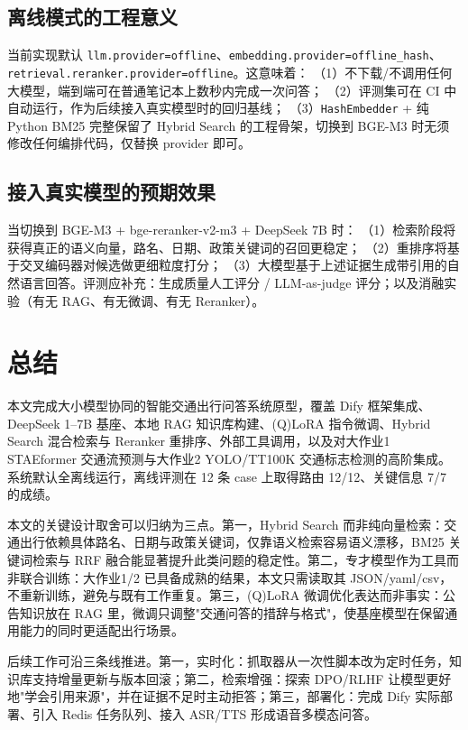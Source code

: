 \documentclass[bwprint]{report}
\begin{document}
\subsection{离线模式的工程意义}
当前实现默认 \texttt{llm.provider=offline}、\texttt{embedding.provider=offline\_hash}、\texttt{retrieval.reranker.provider=offline}。这意味着：
（1）不下载/不调用任何大模型，端到端可在普通笔记本上数秒内完成一次问答；
（2）评测集可在 CI 中自动运行，作为后续接入真实模型时的回归基线；
（3）\texttt{HashEmbedder} + 纯 Python BM25 完整保留了 Hybrid Search 的工程骨架，切换到 BGE-M3 时无须修改任何编排代码，仅替换 provider 即可。

\subsection{接入真实模型的预期效果}
当切换到 BGE-M3 + bge-reranker-v2-m3 + DeepSeek 7B 时：
（1）检索阶段将获得真正的语义向量，路名、日期、政策关键词的召回更稳定；
（2）重排序将基于交叉编码器对候选做更细粒度打分；
（3）大模型基于上述证据生成带引用的自然语言回答。评测应补充：生成质量人工评分 / LLM-as-judge 评分；以及消融实验（有无 RAG、有无微调、有无 Reranker）。

\section{总结}
本文完成大小模型协同的智能交通出行问答系统原型，覆盖 Dify 框架集成、DeepSeek 1--7B 基座、本地 RAG 知识库构建、(Q)LoRA 指令微调、Hybrid Search 混合检索与 Reranker 重排序、外部工具调用，以及对大作业1 STAEformer 交通流预测与大作业2 YOLO/TT100K 交通标志检测的高阶集成。系统默认全离线运行，离线评测在 12 条 case 上取得路由 12/12、关键信息 7/7 的成绩。

本文的关键设计取舍可以归纳为三点。第一，Hybrid Search 而非纯向量检索：交通出行依赖具体路名、日期与政策关键词，仅靠语义检索容易语义漂移，BM25 关键词检索与 RRF 融合能显著提升此类问题的稳定性。第二，专才模型作为工具而非联合训练：大作业1/2 已具备成熟的结果，本文只需读取其 JSON/yaml/csv，不重新训练，避免与既有工作重复。第三，(Q)LoRA 微调优化表达而非事实：公告知识放在 RAG 里，微调只调整"交通问答的措辞与格式"，使基座模型在保留通用能力的同时更适配出行场景。

后续工作可沿三条线推进。第一，实时化：抓取器从一次性脚本改为定时任务，知识库支持增量更新与版本回滚；第二，检索增强：探索 DPO/RLHF 让模型更好地"学会引用来源"，并在证据不足时主动拒答；第三，部署化：完成 Dify 实际部署、引入 Redis 任务队列、接入 ASR/TTS 形成语音多模态问答。



\end{document}
